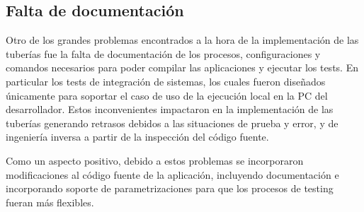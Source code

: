 \subsection{Falta de documentación}
%
Otro de los grandes problemas encontrados a la hora de la
implementación de las tuberías fue la falta de documentación de los
procesos, configuraciones y comandos necesarios para poder compilar
las aplicaciones y ejecutar los tests. En particular los tests de
integración de sistemas, los cuales fueron diseñados únicamente para
soportar el caso de uso de la ejecución local en la PC del
desarrollador. Estos inconvenientes impactaron en la implementación de
las tuberías generando retrasos debidos a las situaciones de prueba y
error, y de ingeniería inversa a partir de la inspección del código
fuente.

Como un aspecto positivo, debido a estos problemas se incorporaron
modificaciones al código fuente de la aplicación, incluyendo
documentación e incorporando soporte de parametrizaciones para que los
procesos de testing fueran más flexibles.
